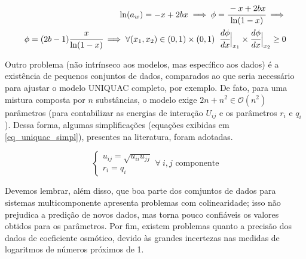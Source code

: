 \documentclass[
	12pt,				%
	openright,
	twoside,
	a4paper,			%
	english,			%
	french,				%
	spanish,			%
	brazil				%
	]{abntex2}
\begin{document}
\begin{equation}
	\label{eq_phi_virial_mono_frac}
	\begin{split}
		\ln(a_w) = -x + 2bx \implies \phi =
			\cfrac{-x + 2bx}{\ln(1-x)}\implies\\
		\phi = (2b-1)\cfrac{x}{\ln(1-x)} \implies
			\forall (x_1,x_2) \in (0,1)\times(0,1)\;\;
			\cfrac{d\phi}{dx}\Big|_{x_1} \times
			\cfrac{d\phi}{dx}\Big|_{x_2} \ge 0
	\end{split}
\end{equation}

Outro problema (não intrínseco aos modelos, mas específico aos dados) é a
existência de pequenos conjuntos de dados, comparados ao que seria
necessário para ajustar o modelo UNIQUAC completo, por exemplo. De fato,
para uma mistura composta por $n$ substâncias, o modelo exige
$2n+n^2 \in \mathcal{O}(n^2)$ parâmetros (para contabilizar as energias de
interação $U_{ij}$ e os parâmetros $r_i$ e $q_i$). Dessa forma, algumas
simplificações (equações exibidas em \ref{eq_uniquac_simpl}), presentes
na literatura, foram adotadas.

\begin{equation}
	\label{eq_uniquac_simpl}
	\begin{cases}
		u_{ij} = \sqrt{u_{ii}u_{jj}}\\
		r_i = q_i
	\end{cases}\forall\ i, j\text{ componente}
\end{equation}

Devemos lembrar, além disso, que boa parte dos comjuntos de dados para sistemas
multicomponente apresenta problemas com colinearidade; isso não prejudica a
predição de novos dados, mas torna pouco confiáveis os valores obtidos para os
parâmetros. Por fim, existem problemas quanto a precisão dos dados de coeficiente
osmótico, devido às grandes incertezas nas medidas de logaritmos de números
próximos de 1.
\end{document}

